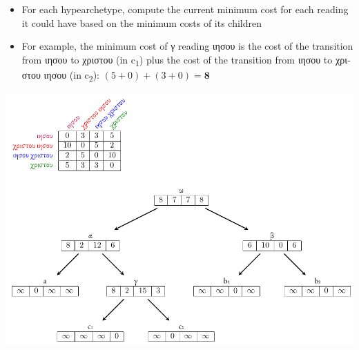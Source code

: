 \documentclass[10pt]{beamer}
\begin{document}
	\begin{frame}
		\begin{itemize}
			\item For each hypearchetype, compute the current minimum cost for each reading it could have based on the minimum costs of its children
			\item For example, the minimum cost of {\renewfontfamily{}\textgreek{γ}} reading \textgreek{ιησου} is the cost of the transition from \textgreek{ιησου} to \textgreek{χριστου} (in {\setmainfont{EB Garamond}c\textsubscript{1}}) plus the cost of the transition from \textgreek{ιησου} to \textgreek{χριστου ιησου} (in {\setmainfont{EB Garamond}c\textsubscript{2}}): $(5+0) + (3+0) = \mathbf{8}$
		\end{itemize}
		\vspace{0.025\baselineskip}
		\begin{center}
			\includegraphics[scale=0.5]{../img/gene-tree-unrooted-sankoff.pdf}
		\end{center}
	\end{frame}
\end{document}
